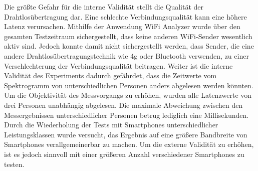 Die größte Gefahr für die interne Validität stellt die Qualität der Drahtlosübertragung dar. Eine schlechte Verbindungsqualität kann eine höhere Latenz verursachen. Mithilfe der Anwendung WiFi Analyzer wurde über den gesamten Testzeitraum sichergestellt, dass keine anderen WiFi-Sender wesentlich aktiv sind. Jedoch konnte damit nicht sichergestellt werden, dass Sender, die eine andere Drahtlosübertragungstechnik wie 4g oder Bluetooth verwenden, zu einer Verschlechterung der Verbindungsqualität beitragen. Weiter ist die interne Validität des Experiments dadurch gefährdet, dass die Zeitwerte vom Spektrogramm von unterschiedlichen Personen anders abgelesen werden könnten. Um die Objektivität des Messvorgangs zu erhöhen, wurden alle Latenzwerte von drei Personen unabhängig abgelesen. Die maximale Abweichung zwischen den Messergebnissen unterschiedlicher Personen betrug lediglich eine Millisekunden. Durch die Wiederholung der Tests mit Smartphones unterschiedlicher Leistungsklassen wurde versucht, das Ergebnis auf eine größere Bandbreite von Smartphones verallgemeinerbar zu machen. Um die externe Validität zu erhöhen, ist es jedoch sinnvoll mit einer größeren Anzahl verschiedener Smartphones zu testen.